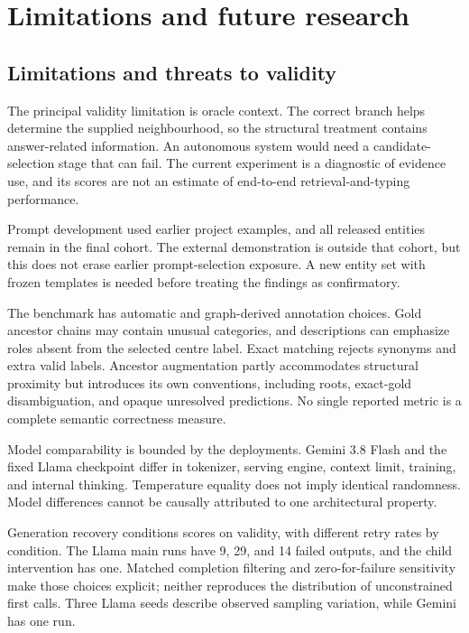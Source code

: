 \chapter{Limitations and future research}

\FloatBarrier

\section{Limitations and threats to validity}

The principal validity limitation is oracle context. The correct branch helps determine the supplied neighbourhood, so the structural treatment contains answer-related information. An autonomous system would need a candidate-selection stage that can fail. The current experiment is a diagnostic of evidence use, and its scores are not an estimate of end-to-end retrieval-and-typing performance.


Prompt development used earlier project examples, and all released entities remain in the final cohort. The external demonstration is outside that cohort, but this does not erase earlier prompt-selection exposure. A new entity set with frozen templates is needed before treating the findings as confirmatory.


The benchmark has automatic and graph-derived annotation choices. Gold ancestor chains may contain unusual categories, and descriptions can emphasize roles absent from the selected centre label. Exact matching rejects synonyms and extra valid labels. Ancestor augmentation partly accommodates structural proximity but introduces its own conventions, including roots, exact-gold disambiguation, and opaque unresolved predictions. No single reported metric is a complete semantic correctness measure.


Model comparability is bounded by the deployments. Gemini 3.8 Flash and the fixed Llama checkpoint differ in tokenizer, serving engine, context limit, training, and internal thinking. Temperature equality does not imply identical randomness. Model differences cannot be causally attributed to one architectural property.


Generation recovery conditions scores on validity, with different retry rates by condition. The Llama main runs have 9, 29, and 14 failed outputs, and the child intervention has one. Matched completion filtering and zero-for-failure sensitivity make those choices explicit; neither reproduces the distribution of unconstrained first calls. Three Llama seeds describe observed sampling variation, while Gemini has one run.


